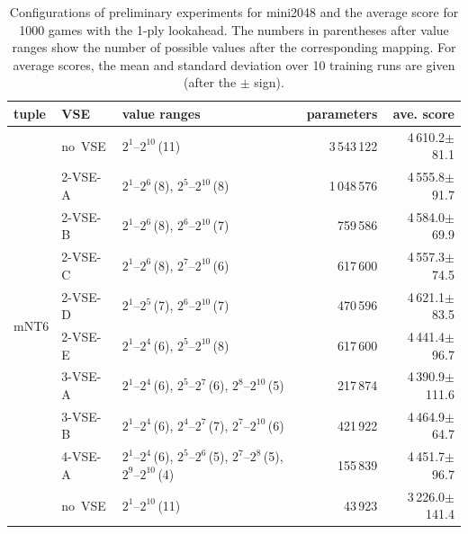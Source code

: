 \begin{table}
\caption{Configurations of preliminary experiments for mini2048 and the average score for 1000 games with the 1-ply lookahead. The numbers in parentheses after value ranges show the number of possible values after the corresponding mapping. For average scores, the mean and standard deviation over 10 training runs are given (after the $\pm$ sign).}
\label{table:pre-results}
 \setlength{\doublerulesep}{.4pt}
 \centering\begin{tabular}{l|l|p{170pt}|r|r}
  \hline\hline
   tuple			& VSE			& value ranges									& parameters	& ave. score \\
  \hline
   \multirow{11}{*}{\textsf{mNT6}}	& \mbox{no VSE}		& \phantom{\rule{1pt}{9.5pt}}$2^1$--$2^{10}$\,(11)								& 3\,543\,122	& 4\,610.2$\pm$\phantom{0}81.1 \\ \cline{2-5}
				& \mbox{2-VSE-A}	& \phantom{\rule{1pt}{9.5pt}}$2^1$--$2^6$\,(8), $2^{5}$--$2^{10}$\,(8)					& 1\,048\,576	& 4\,555.8$\pm$\phantom{0}91.7\\ \cline{2-5}
				& \mbox{2-VSE-B}	& \phantom{\rule{1pt}{9.5pt}}$2^1$--$2^6$\,(8), $2^{6}$--$2^{10}$\,(7)					& 759\,586	& 4\,584.0$\pm$\phantom{0}69.9\\ \cline{2-5}
				& \mbox{2-VSE-C}	& \phantom{\rule{1pt}{9.5pt}}$2^1$--$2^6$\,(8), $2^{7}$--$2^{10}$\,(6)					& 617\,600	& 4\,557.3$\pm$\phantom{0}74.5\\ \cline{2-5}
				& \mbox{2-VSE-D}	& \phantom{\rule{1pt}{9.5pt}}$2^1$--$2^5$\,(7), $2^{6}$--$2^{10}$\,(7)					& 470\,596	& 4\,621.1$\pm$\phantom{0}83.5\\ \cline{2-5}
				& \mbox{2-VSE-E}	& \phantom{\rule{1pt}{9.5pt}}$2^1$--$2^4$\,(6), $2^{5}$--$2^{10}$\,(8)					& 617\,600	& 4\,441.4$\pm$\phantom{0}96.7\\ \cline{2-5}
				& \mbox{3-VSE-A}	& \phantom{\rule{1pt}{9.5pt}}$2^1$--$2^4$\,(6), $2^{5}$--$2^{7}$\,(6), $2^8$--$2^{10}$\,(5)			& 217\,874	& 4\,390.9$\pm$111.6\\ \cline{2-5}
				& \mbox{3-VSE-B}	& \phantom{\rule{1pt}{9.5pt}}$2^1$--$2^4$\,(6), $2^{4}$--$2^{7}$\,(7), $2^7$--$2^{10}$\,(6)			& 421\,922	& 4\,464.9$\pm$\phantom{0}64.7\\ \cline{2-5}
				& \mbox{4-VSE-A}	& \phantom{\rule{1pt}{9.5pt}}$2^1$--$2^4$\,(6), $2^5$--$2^6$\,(5), $2^7$--$2^8$\,(5), $2^9$--$2^{10}$\,(4)	& 155\,839	& 4\,451.7$\pm$\phantom{0}96.7\\ \hline
   \textsf{mNT4}				& \mbox{no VSE}		& \phantom{\rule{1pt}{9.5pt}}$2^1$--$2^{10}$\,(11)								& 43\,923	& 3\,226.0$\pm$141.4\\\hline
 \end{tabular}
\end{table}

